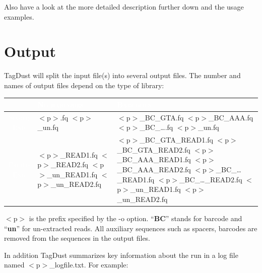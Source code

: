 \documentclass[11pt,a4paper,oneside]{book}
\begin{document}
Also have a look at the more detailed description further down and the usage examples. 


\newpage 
\section{Output}
TagDust will split the input file(s) into several output files. The number and names of output files depend on the type of library: 


\begin{center}
\begin{tabular}{ | c | p{4.5cm} | p{4.5cm}|}
\hline
 \textcolor{white}{\scshape }		&\cellcolor{blue}\textcolor{white}{\scshape No barcodes}		&	\cellcolor{blue}\textcolor{white}{\scshape Barcodes}\\ \hline
\cellcolor{blue}\textcolor{white}{\scshape Single End} & $<$p$>$.fq \newline $<$p$>$\_un.fq & $<$p$>$\_BC\_GTA.fq $<$p$>$\_BC\_AAA.fq $<$p$>$\_BC\_\dots.fq \newline $<$p$>$\_un.fq \\
\cellcolor{blue}\textcolor{white}{\scshape Paired End} &  $<$p$>$\_READ1.fq $<$p$>$\_READ2.fq $<$p$>$\_un\_READ1.fq $<$p$>$\_un\_READ2.fq   & $<$p$>$\_BC\_GTA\_READ1.fq $<$p$>$\_BC\_GTA\_READ2.fq  $<$p$>$\_BC\_AAA\_READ1.fq $<$p$>$\_BC\_AAA\_READ2.fq $<$p$>$\_BC\_\dots\_READ1.fq $<$p$>$\_BC\_\dots\_READ2.fq $<$p$>$\_un\_READ1.fq $<$p$>$\_un\_READ2.fq\\ 
\hline
\end{tabular}
\end{center}
$<$p$>$ is the prefix specified by the -o option. ``{\bf BC}'' stands for barcode and ``{\bf un}'' for un-extracted reads. All auxiliary sequences such as spacers, barcodes are removed from the sequences in the output files. 

In addition TagDust summarizes key information about the run in a log file named $<$p$>$\_logfile.txt. For example:
	
\end{document}
